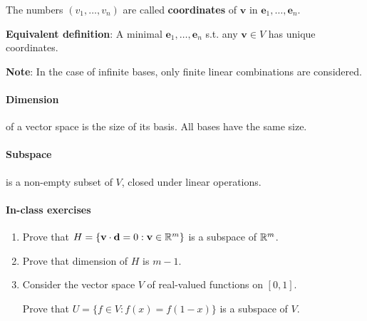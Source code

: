 \documentclass{article}
\begin{document}
The numbers $(v_1,\dots,v_n)$ are called \textbf{coordinates} of $\mathbf v$ in $\mathbf e_1,\dots,\mathbf e_n$.

\textbf{Equivalent definition}: A minimal $\mathbf e_1, \dots, \mathbf e_n$ s.t. any $\mathbf v \in V$ has unique coordinates.

\textbf{Note}: In the case of infinite bases, only finite linear combinations are considered.

\paragraph{Dimension} of a vector space is the size of its basis. All bases have the same size.

\paragraph{Subspace} is a non-empty subset of $V$, closed under linear operations.

\paragraph{In-class exercises}

\begin{enumerate}
\item Prove that $H = \{\mathbf v \cdot \mathbf d = 0 : \mathbf v \in \mathbb{R}^m \}$ is a subspace of $\mathbb{R}^m$.
\item Prove that dimension of $H$ is $m-1$.
\item Consider the vector space $V$ of real-valued functions on $[0, 1]$.

Prove that $U = \{f \in V : f(x) = f(1-x) \}$ is a subspace of $V$.
\end{enumerate}
\end{document}
